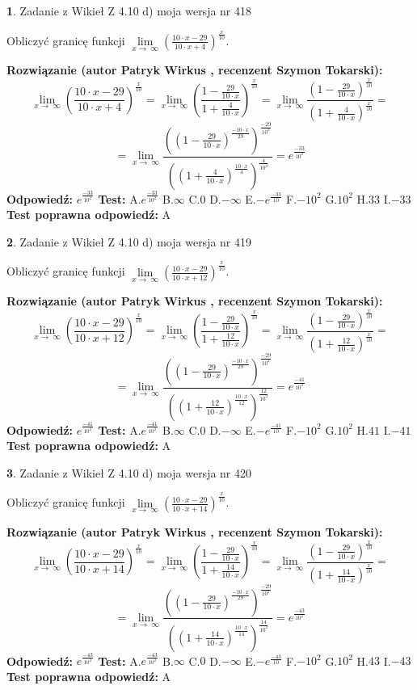\documentclass[12pt, a4paper]{article}
\theoremstyle{definition} %
\newtheorem{zad}{}
\newcommand{\zadStart}[1]{\begin{zad}#1\newline}
\newcommand{\zadStop}{\end{zad}}
\newcommand{\rozwStart}[2]{\noindent \textbf{Rozwiązanie (autor #1 , recenzent #2): }\newline}
\newcommand{\rozwStop}{\newline}
\newcommand{\odpStart}{\noindent \textbf{Odpowiedź:}\newline}
\newcommand{\odpStop}{\newline}
\newcommand{\testStart}{\noindent \textbf{Test:}\newline}
\newcommand{\testStop}{\newline}
\newcommand{\kluczStart}{\noindent \textbf{Test poprawna odpowiedź:}\newline}
\newcommand{\kluczStop}{\newline}
\begin{document}
\zadStart{Zadanie z Wikieł Z 4.10 d) moja wersja nr 418}


Obliczyć granicę funkcji  $\lim\limits_{x\to\ \infty}(\frac{10\cdot x-29}{10\cdot x+4})^{\frac{x}{10}}$.
\zadStop
\rozwStart{Patryk Wirkus}{Szymon Tokarski}
$$\lim\limits_{x\to\ \infty}(\frac{10\cdot x-29}{10\cdot x+4})^{\frac{x}{10}} = \lim\limits_{x\to\ \infty}(\frac{1-\frac{29}{10\cdot x}}{1+\frac{4}{10\cdot x}})^{\frac{x}{10}}=\lim\limits_{x\to\ \infty}\frac{(1-\frac{29}{10\cdot x})^{\frac{x}{10}}}{(1+\frac{4}{10\cdot x})^{\frac{x}{10}}}=$$
$$=\lim\limits_{x\to\ \infty}\frac{((1-\frac{29}{10\cdot x})^{\frac{-10\cdot x}{29}})^{\frac{-29}{10^{2}}}}{((1+\frac{4}{10\cdot x})^{\frac{10\cdot x}{4}})^{\frac{4}{10^{2}}}}=e^{\frac{-33}{10^{2}}}$$
\rozwStop
\odpStart
$e^{\frac{-33}{10^{2}}}$
\odpStop
\testStart
A.$e^{\frac{-33}{10^{2}}}$ B.$\infty$ C.$0$ D.$-\infty$ E.$-e^{\frac{-33}{10}}$
F.$-10^{2}$ G.$10^{2}$
H.$33$
I.$-33$
\testStop
\kluczStart
A
\kluczStop



\zadStart{Zadanie z Wikieł Z 4.10 d) moja wersja nr 419}


Obliczyć granicę funkcji  $\lim\limits_{x\to\ \infty}(\frac{10\cdot x-29}{10\cdot x+12})^{\frac{x}{10}}$.
\zadStop
\rozwStart{Patryk Wirkus}{Szymon Tokarski}
$$\lim\limits_{x\to\ \infty}(\frac{10\cdot x-29}{10\cdot x+12})^{\frac{x}{10}} = \lim\limits_{x\to\ \infty}(\frac{1-\frac{29}{10\cdot x}}{1+\frac{12}{10\cdot x}})^{\frac{x}{10}}=\lim\limits_{x\to\ \infty}\frac{(1-\frac{29}{10\cdot x})^{\frac{x}{10}}}{(1+\frac{12}{10\cdot x})^{\frac{x}{10}}}=$$
$$=\lim\limits_{x\to\ \infty}\frac{((1-\frac{29}{10\cdot x})^{\frac{-10\cdot x}{29}})^{\frac{-29}{10^{2}}}}{((1+\frac{12}{10\cdot x})^{\frac{10\cdot x}{12}})^{\frac{12}{10^{2}}}}=e^{\frac{-41}{10^{2}}}$$
\rozwStop
\odpStart
$e^{\frac{-41}{10^{2}}}$
\odpStop
\testStart
A.$e^{\frac{-41}{10^{2}}}$ B.$\infty$ C.$0$ D.$-\infty$ E.$-e^{\frac{-41}{10}}$
F.$-10^{2}$ G.$10^{2}$
H.$41$
I.$-41$
\testStop
\kluczStart
A
\kluczStop



\zadStart{Zadanie z Wikieł Z 4.10 d) moja wersja nr 420}


Obliczyć granicę funkcji  $\lim\limits_{x\to\ \infty}(\frac{10\cdot x-29}{10\cdot x+14})^{\frac{x}{10}}$.
\zadStop
\rozwStart{Patryk Wirkus}{Szymon Tokarski}
$$\lim\limits_{x\to\ \infty}(\frac{10\cdot x-29}{10\cdot x+14})^{\frac{x}{10}} = \lim\limits_{x\to\ \infty}(\frac{1-\frac{29}{10\cdot x}}{1+\frac{14}{10\cdot x}})^{\frac{x}{10}}=\lim\limits_{x\to\ \infty}\frac{(1-\frac{29}{10\cdot x})^{\frac{x}{10}}}{(1+\frac{14}{10\cdot x})^{\frac{x}{10}}}=$$
$$=\lim\limits_{x\to\ \infty}\frac{((1-\frac{29}{10\cdot x})^{\frac{-10\cdot x}{29}})^{\frac{-29}{10^{2}}}}{((1+\frac{14}{10\cdot x})^{\frac{10\cdot x}{14}})^{\frac{14}{10^{2}}}}=e^{\frac{-43}{10^{2}}}$$
\rozwStop
\odpStart
$e^{\frac{-43}{10^{2}}}$
\odpStop
\testStart
A.$e^{\frac{-43}{10^{2}}}$ B.$\infty$ C.$0$ D.$-\infty$ E.$-e^{\frac{-43}{10}}$
F.$-10^{2}$ G.$10^{2}$
H.$43$
I.$-43$
\testStop
\kluczStart
A
\kluczStop
\end{document}
